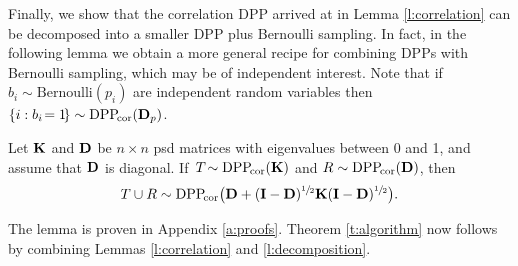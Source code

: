 \documentclass[11pt]{article}
\begin{document}
Finally, we show that the correlation DPP arrived at in Lemma
\ref{l:correlation} can be decomposed into a smaller DPP plus
Bernoulli sampling. In fact, in the following lemma we obtain a more
general recipe for combining DPPs with Bernoulli sampling, which may
be of independent interest. Note that if $b_i\sim\mathrm{Bernoulli}(p_i)$ are independent random
variables then $\{i:b_i\!=1\!\}\sim{{\mathrm{DPP}}_{\!\mathrm{cor}}}(\mathbf D_p)$.
\begin{lemma}\label{l:decomposition}
  Let $\mathbf K$ and $\mathbf D$ be $n\times n$ psd matrices with eigenvalues between
0 and 1, and assume that $\mathbf D$ is diagonal. If\, $T\!\sim{{\mathrm{DPP}}_{\!\mathrm{cor}}}(\mathbf K)$ and
$R\sim{{\mathrm{DPP}}_{\!\mathrm{cor}}}(\mathbf D)$, then
\begin{align*}T\cup R\sim {{\mathrm{DPP}}_{\!\mathrm{cor}}}\big(\mathbf D+(\mathbf I-\mathbf D)^{\sfrac12}\mathbf K
  (\mathbf I-\mathbf D)^{\sfrac12}\big).
  \end{align*}
\end{lemma}
The lemma is proven in Appendix \ref{a:proofs}. Theorem
\ref{t:algorithm} now follows by combining Lemmas \ref{l:correlation} and \ref{l:decomposition}.
\end{document}
